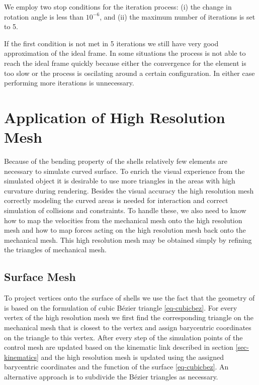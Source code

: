 \documentclass{egpubl}
\begin{document}
We employ two stop conditions for the iteration process:
(i) the change in rotation angle is less than $10^{-6}$, and
(ii) the maximum number of iterations is set to 5.

If the first condition is not met in 5 iterations 
we still have very good approximation of the ideal frame. In some
situations the process is not able to reach the ideal frame quickly because
either the convergence for the element is too slow or the process is oscilating around a certain configuration.
In either case performing more iterations is unnecessary.




\section{Application of High Resolution Mesh} %

Because of the bending property of the shells relatively few elements are
necessary to simulate curved surface. To enrich the visual experience from
the simulated object it is desirable to use more triangles in the areas
with high curvature during rendering. 
Besides the visual accuracy the high resolution mesh correctly modeling the curved areas is needed for
interaction and correct simulation of collisions and constraints. 
To handle these, we also need to know how to map the velocities from the mechanical
mesh onto the high resolution mesh and how to map forces acting on the high
resolution mesh back onto the mechanical mesh.
This high resolution mesh may be obtained simply by refining the triangles of mechanical mesh.

\subsection{Surface Mesh}

To project vertices onto the surface of shells 
we use the fact that the geometry of is based on the formulation
of cubic B\'ezier triangle \eqref{eq-cubicbez}. For every vertex of the high
resolution mesh we first find the corresponding triangle on the mechanical
mesh that is closest to the vertex and assign barycentric coordinates on
the triangle to this vertex. After every step of the simulation points of the
control mesh are updated based on the kinematic link described in
section \ref{sec-kinematics} and the high
resolution mesh is updated using the assigned barycentric coordinates and
the function of the surface \eqref{eq-cubicbez}. An alternative approach is to
subdivide the B\'ezier triangles as necessary.
\end{document}
